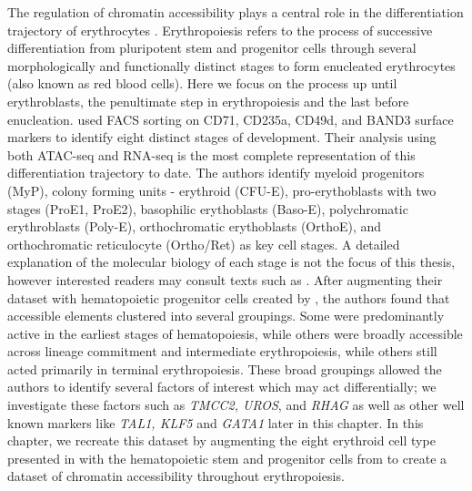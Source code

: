 The regulation of chromatin accessibility plays a central role in the differentiation trajectory of erythrocytes \cite{Hu2016,Schulz2019}. Erythropoiesis refers to the process of  successive differentiation from pluripotent stem and progenitor cells through several morphologically and functionally distinct stages to form enucleated erythrocytes (also known as red blood cells). Here we focus on the process up until erythroblasts, the penultimate step in erythropoiesis and the last before enucleation. \textcite{Ludwig2019} used FACS sorting on CD71, CD235a, CD49d, and BAND3 surface markers to identify eight distinct stages of development. Their analysis using both ATAC-seq and RNA-seq is the most complete representation of this differentiation trajectory to date. The authors identify myeloid progenitors (MyP), colony forming units - erythroid (CFU-E), pro-erythoblasts with two stages (ProE1, ProE2), basophilic erythoblasts (Baso-E), polychromatic erythroblasts (Poly-E), orthochromatic erythoblasts (OrthoE), and orthochromatic reticulocyte (Ortho/Ret) as key cell stages. A detailed explanation of the molecular biology of each stage is not the focus of this thesis, however interested readers may consult texts such as \textcite{Sinclair2013}. After augmenting their dataset with hematopoietic progenitor cells created by \textcite{Corces2016}, the authors found that accessible elements clustered into several groupings. Some were predominantly active in the earliest stages of hematopoiesis, while others were broadly accessible across lineage commitment and intermediate erythropoiesis, while others still acted primarily in terminal erythropoiesis. 
These broad groupings allowed the authors to identify several factors of interest which may act differentially; we investigate these factors such as \textit{TMCC2, UROS}, and \textit{RHAG} as well as other well known markers like \textit{TAL1, KLF5} and \textit{GATA1} later in this chapter. In this chapter, we recreate this dataset by augmenting the eight erythroid cell type presented in \textcite{Ludwig2019} with the hematopoietic stem and progenitor cells from \textcite{Corces2016} to create a dataset of chromatin accessibility throughout erythropoiesis.


